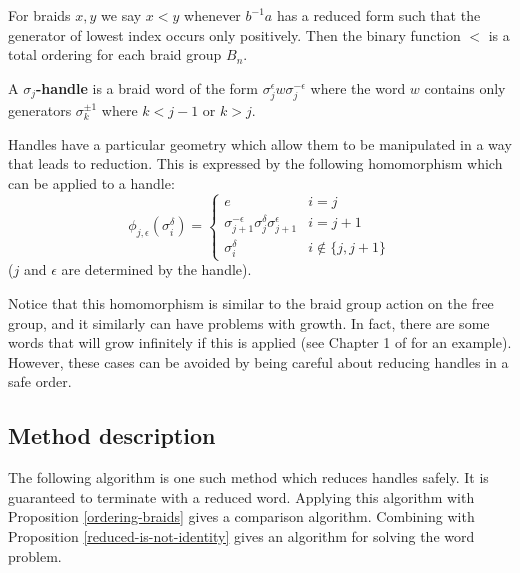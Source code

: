 \documentclass[12pt]{thesis}
\begin{document}
\begin{proposition}
    \label{ordering-braids}
    For braids $x, y$ we say $x < y$ 
    whenever $b^{-1}a$ has a reduced form such that the 
    generator of lowest index occurs only positively.
    Then the binary function $<$ is a total ordering for each braid group $B_{n}$.
\end{proposition}

\begin{definition}
    A \textbf{$\sigma_{j}$-handle} is a braid word of the form $\sigma_{j}^{\epsilon}w\sigma_{j}^{-\epsilon}$
    where the word $w$ contains only generators $\sigma_{k}^{\pm 1}$ where $k < j - 1$ or $k > j$.
\end{definition}

Handles have a particular geometry which allow
them to be manipulated in a way that leads to reduction.
This is expressed by the following homomorphism
which can be applied to a handle:
\[
    \phi_{j, \epsilon}(\sigma_{i}^{\delta}) = \begin{cases}
        e & i = j \\
        \sigma_{j+1}^{-\epsilon} \sigma_{j}^{\delta} \sigma_{j+1}^{\epsilon} & i = j + 1 \\
        \sigma_{i}^{\delta} & i \not\in \{ j, j + 1 \} 
    \end{cases}
\] ($j$ and $\epsilon$ are
determined by the handle).

Notice that this homomorphism is similar to the braid group action on the free group,
and it similarly can have problems with growth.
In fact, there are some words that will grow infinitely if this is applied (see Chapter 1 of \cite{dehornoy} for an example).
However, these cases can be avoided by being careful about 
reducing handles in a safe order.

\subsection{Method description}

The following algorithm is one such method which reduces handles safely.
It is guaranteed to terminate with a reduced word.
Applying this algorithm with Proposition \ref{ordering-braids}
gives a comparison algorithm.
Combining with Proposition \ref{reduced-is-not-identity}
gives an algorithm for solving the word problem.
\end{document}
